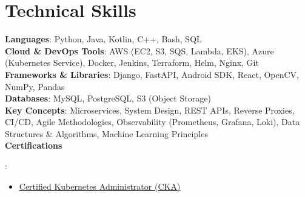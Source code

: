 \section{Technical Skills}
\begin{itemize}[leftmargin=0.15in, label={}]
\small{\item{
\textbf{Languages}{: Python, Java, Kotlin, C++, Bash, SQL} \\
\textbf{Cloud \& DevOps Tools}{: AWS (EC2, S3, SQS, Lambda, EKS), Azure (Kubernetes Service), Docker, Jenkins, Terraform, Helm, Nginx, Git} \\
\textbf{Frameworks \& Libraries}{: Django, FastAPI, Android SDK, React, OpenCV, NumPy, Pandas} \\
\textbf{Databases}{: MySQL, PostgreSQL, S3 (Object Storage)} \\
\textbf{Key Concepts}{: Microservices, System Design, REST APIs, Reverse Proxies, CI/CD, Agile Methodologies, Observability (Prometheus, Grafana, Loki), Data Structures \& Algorithms, Machine Learning Principles} \\
\textbf{Certifications}{:
\begin{itemize}[leftmargin=0.25in, label={$\bullet$}]
\item  \href{https://ti-user-certificates.s3.amazonaws.com/e0df7fbf-a057-42af-8a1f-590912be5460/89db8af7-4d09-479c-be37-e573de75fa11-dhinesh-babu-ramachandran-1b7f788b-1c59-4298-b1a2-87b646ceeed6-certificate.pdf}{\underline{Certified Kubernetes Administrator (CKA)}}
\end{itemize}
}
}}
\end{itemize}